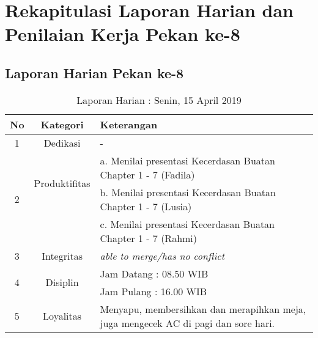 \section{Rekapitulasi Laporan Harian dan Penilaian Kerja Pekan ke-8}

\subsection{Laporan Harian Pekan ke-8}

\begin{table}[htp]
\begin{center}
\caption{Laporan Harian : Senin, 15 April 2019}
\label{tab:lh150419}
\begin{tabularx}{\textwidth}{|l|l|X|}
\hline
\multicolumn{1}{|c|}{\textbf{No}} & \multicolumn{1}{c|}{\textbf{Kategori}} & \textbf{Keterangan} \\ \hline
\multicolumn{1}{|c|}{\multirow{1}{*}{1}} & \multicolumn{1}{c|}{\multirow{1}{*}{\parbox{2.5cm}{Dedikasi}}}
& -\\
\hline
\multicolumn{1}{|c|}{\multirow{3}{*}{2}} & \multicolumn{1}{c|}{\multirow{2}{*}{\parbox{2.5cm}{Produktifitas}}}
& a. Menilai presentasi Kecerdasan Buatan Chapter 1 - 7 (Fadila)\\
\multicolumn{1}{|c|}{\multirow{1}{*}{}} & \multicolumn{1}{c|}{\multirow{1}{*}{\parbox{2.5cm}{}}}
& b. Menilai presentasi Kecerdasan Buatan Chapter 1 - 7 (Lusia)\\
\multicolumn{1}{|c|}{\multirow{1}{*}{}} & \multicolumn{1}{c|}{\multirow{1}{*}{\parbox{2.5cm}{}}}
& c. Menilai presentasi Kecerdasan Buatan Chapter 1 - 7 (Rahmi)\\
\hline
\multicolumn{1}{|c|}{\multirow{1}{*}{3}} & \multicolumn{1}{c|}{\multirow{1}{*}{\parbox{2.5cm}{Integritas}}}
& \textit{able to merge/has no conflict} \\
\hline
\multicolumn{1}{|c|}{\multirow{2}{*}{4}} & \multicolumn{1}{c|}{\multirow{2}{*}{\parbox{2.5cm}{Disiplin}}}
& Jam Datang : 08.50 WIB \\
\multicolumn{1}{|c|}{\multirow{1}{*}{}} & \multicolumn{1}{c|}{\multirow{1}{*}{\parbox{2.5cm}{}}}
& Jam Pulang : 16.00 WIB \\
\hline
\multicolumn{1}{|c|}{\multirow{2}{*}{5}} & \multicolumn{1}{c|}{\multirow{2}{*}{\parbox{2.5cm}{Loyalitas}}}
& Menyapu, membersihkan dan merapihkan meja, juga mengecek AC di pagi dan sore hari.\\
\hline
\end{tabularx}
\end{center}
\end{table}

